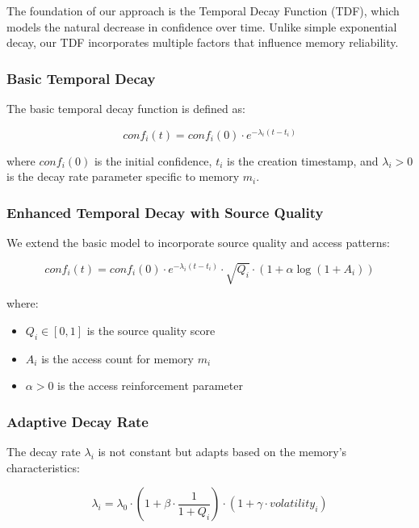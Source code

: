 \documentclass[12pt,a4paper]{article}
\begin{document}
The foundation of our approach is the Temporal Decay Function (TDF), which models the natural decrease in confidence over time. Unlike simple exponential decay, our TDF incorporates multiple factors that influence memory reliability.

\subsubsection{Basic Temporal Decay}

The basic temporal decay function is defined as:

\begin{equation}
conf_i(t) = conf_i(0) \cdot e^{-\lambda_i (t - t_i)}
\end{equation}

where $conf_i(0)$ is the initial confidence, $t_i$ is the creation timestamp, and $\lambda_i > 0$ is the decay rate parameter specific to memory $m_i$.

\subsubsection{Enhanced Temporal Decay with Source Quality}

We extend the basic model to incorporate source quality and access patterns:

\begin{equation}
conf_i(t) = conf_i(0) \cdot e^{-\lambda_i (t - t_i)} \cdot \sqrt{Q_i} \cdot (1 + \alpha \log(1 + A_i))
\end{equation}

where:
\begin{itemize}
\item $Q_i \in [0,1]$ is the source quality score
\item $A_i$ is the access count for memory $m_i$
\item $\alpha > 0$ is the access reinforcement parameter
\end{itemize}

\subsubsection{Adaptive Decay Rate}

The decay rate $\lambda_i$ is not constant but adapts based on the memory's characteristics:

\begin{equation}
\lambda_i = \lambda_0 \cdot \left(1 + \beta \cdot \frac{1}{1 + Q_i}\right) \cdot \left(1 + \gamma \cdot volatility_i\right)
\end{equation}
\end{document}
